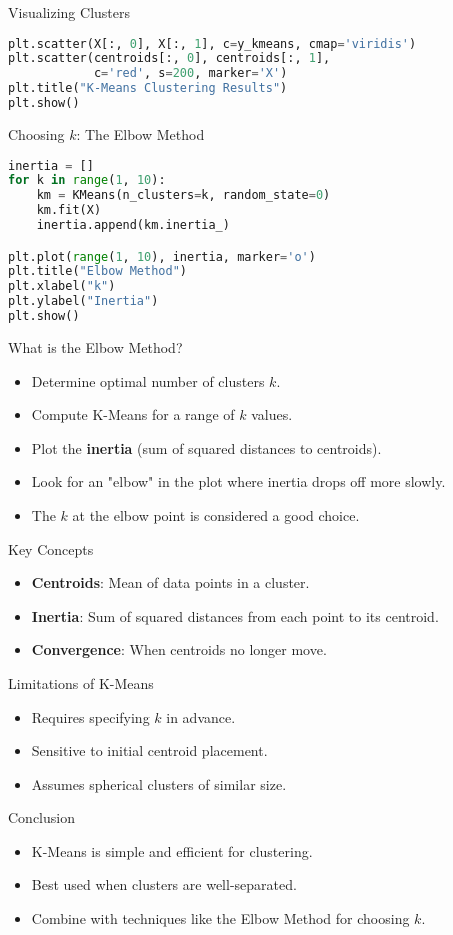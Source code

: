 \documentclass[mathserif,20pt,xcolor=table,compress,aspectratio=169]{beamer}
\begin{document}
\begin{frame}[fragile]{Visualizing Clusters}
\begin{lstlisting}[language=Python]
plt.scatter(X[:, 0], X[:, 1], c=y_kmeans, cmap='viridis')
plt.scatter(centroids[:, 0], centroids[:, 1],
            c='red', s=200, marker='X')
plt.title("K-Means Clustering Results")
plt.show()
\end{lstlisting}
\end{frame}

\begin{frame}[fragile]{Choosing $k$: The Elbow Method}
\begin{lstlisting}[language=Python]
inertia = []
for k in range(1, 10):
    km = KMeans(n_clusters=k, random_state=0)
    km.fit(X)
    inertia.append(km.inertia_)

plt.plot(range(1, 10), inertia, marker='o')
plt.title("Elbow Method")
plt.xlabel("k")
plt.ylabel("Inertia")
plt.show()
\end{lstlisting}
\end{frame}


\begin{frame}{What is the Elbow Method?}
\begin{itemize}
    \item Determine optimal number of clusters $k$.
    \item Compute K-Means for a range of $k$ values.
    \item Plot the \textbf{inertia} (sum of squared distances to centroids).
    \item Look for an "elbow" in the plot where inertia drops off more slowly.
    \item The $k$ at the elbow point is considered a good choice.
\end{itemize}
\end{frame}

\begin{frame}{Key Concepts}
\begin{itemize}
    \item \textbf{Centroids}: Mean of data points in a cluster.
    \item \textbf{Inertia}: Sum of squared distances from each point to its centroid.
    \item \textbf{Convergence}: When centroids no longer move.
\end{itemize}
\end{frame}

\begin{frame}{Limitations of K-Means}
\begin{itemize}
    \item Requires specifying $k$ in advance.
    \item Sensitive to initial centroid placement.
    \item Assumes spherical clusters of similar size.
\end{itemize}
\end{frame}

\begin{frame}{Conclusion}
\begin{itemize}
    \item K-Means is simple and efficient for clustering.
    \item Best used when clusters are well-separated.
    \item Combine with techniques like the Elbow Method for choosing $k$.
\end{itemize}
\end{frame}
\end{document}
